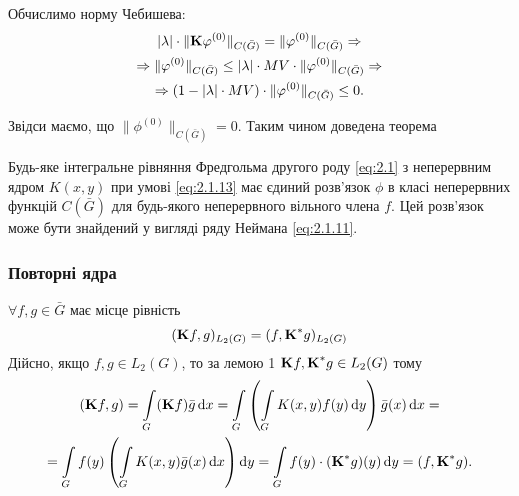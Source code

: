 Обчислимо норму Чебишева: 
\begin{multline*} 
	|\lambda| \cdot \|\bf{K} \phi^{(0)}\|_{C(\bar G)} = \| \phi^{(0)} \|_{C(\bar G)} \Rightarrow \\
	\Rightarrow \| \phi^{(0)} \|_{C(\bar G)} \le |\lambda| \cdot MV \cdot \|\phi^{(0)}\|_{C(\bar G)} \Rightarrow \\
	\Rightarrow (1 - |\lambda| \cdot MV) \cdot \|\phi^{(0)}\|_{C(\bar G)} \le 0.
\end{multline*}

Звідси маємо, що $\|\phi^{(0)}\|_{C(\bar G)} = 0$. Таким чином доведена теорема

\begin{theorem}
	Будь-яке інтегральне рівняння Фредгольма другого роду \eqref{eq:2.1} з неперервним ядром $K(x, y)$ при умові \eqref{eq:2.1.13} має єдиний розв’язок $\phi$ в класі неперервних функцій $C(\bar G)$ для будь-якого неперервного вільного члена $f$. Цей роз\-в’я\-зок може бути знайдений у вигляді ряду Неймана \eqref{eq:2.1.11}.
\end{theorem}

\subsubsection{Повторні ядра}

$\forall f, g \in \bar G$ має місце рівність 
\begin{equation}
	\label{eq:2.1.14}
	(\bf{K}f,g)_{L_2(G)} = (f, \bf{K}^*g)_{L_2(G)}
\end{equation}
Дійсно, якщо $f, g \in L_2(G)$, то за лемою 1 $\bf{K}f, \bf{K}^*g \in L_2(G)$ тому
\begin{multline*}
	(\bf{K}f, g) = \Int_G (\bf{K}f)\bar g \diff x = \Int_G \left( \Int_G K(x, y) f(y) \diff y\right) \bar g(x) \diff x = \\
	= \Int_G f(y) \left( \Int_G K(x, y) \bar g(x) \diff x\right) \diff y = \Int_G f(y) \cdot (\bf{K}^* g)(y) \diff y = (f, \bf{K}^*g).
\end{multline*}

